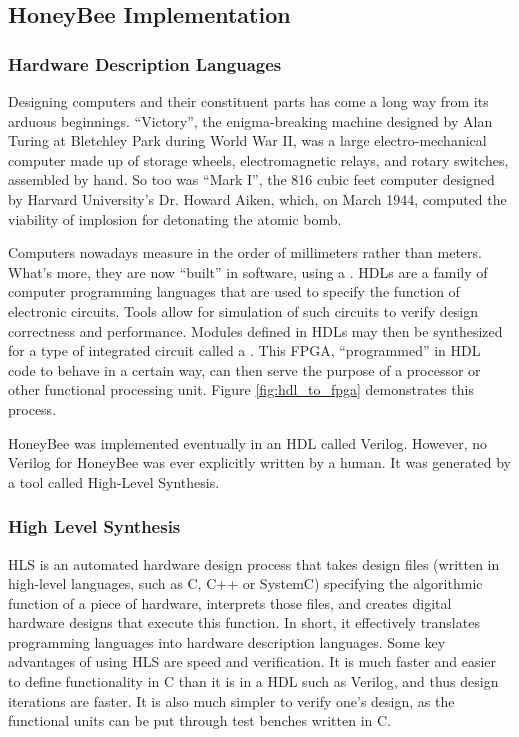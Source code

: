 \subsection{HoneyBee Implementation}
\label{section:honeybee_implementation}
    \subsubsection{Hardware Description Languages}
        Designing computers and their constituent parts has come a long way from its arduous beginnings. ``Victory'', the enigma-breaking machine designed by Alan Turing at Bletchley Park during World War II, was a large electro-mechanical computer made up of storage wheels, electromagnetic relays, and rotary switches, assembled by hand.\cite{ChoiceReviews2006} So too was ``Mark I'', the 816 cubic feet computer designed by Harvard University's Dr. Howard Aiken, which, on March 1944, computed the viability of implosion for detonating the atomic bomb.\cite{Elsabbagh2019}
        
        

        Computers nowadays measure in the order of millimeters rather than meters. What's more, they are now ``built'' in software, using a . \glspl{HDL} are a family of computer programming languages that are used to specify the function of electronic circuits. Tools allow for simulation of such circuits to verify design correctness and performance. Modules defined in \glspl{HDL} may then be synthesized for a type of integrated circuit called a . This \gls{FPGA}, ``programmed'' in \gls{HDL} code to behave in a certain way, can then serve the purpose of a processor or other functional processing unit. Figure \ref{fig:hdl_to_fpga} demonstrates this process.

        

        HoneyBee was implemented eventually in an \gls{HDL} called Verilog. However, no Verilog for HoneyBee was ever explicitly written by a human. It was generated by a tool called High-Level Synthesis.

    \subsubsection{High Level Synthesis}
        \gls{HLS} is an automated hardware design process that takes design files (written in high-level languages, such as C, C++ or SystemC) specifying the algorithmic function of a piece of hardware, interprets those files, and creates digital hardware designs that execute this function. In short, it effectively translates programming languages into hardware description languages. Some key advantages of using HLS are speed and verification. It is much faster and easier to define functionality in C than it is in a \gls{HDL} such as Verilog, and thus design iterations are faster. It is also much simpler to verify one's design, as the functional units can be put through test benches written in C. \\

